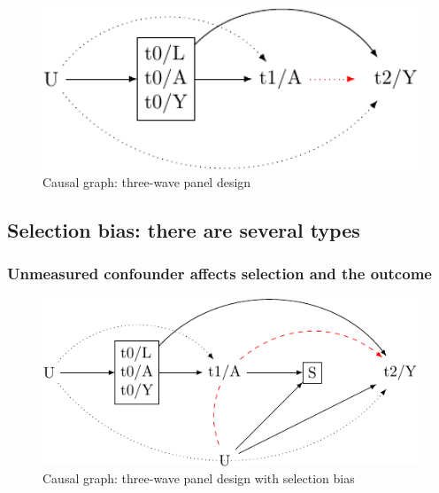 \documentclass[
  singlecolumn]{report}
\begin{document}
\begin{figure}

{\centering \includegraphics[width=1\textwidth,height=\textheight]{causal-dags_files/figure-pdf/fig-dag-6-1.pdf}

}

\caption{\label{fig-dag-6}Causal graph: three-wave panel design}

\end{figure}

\hypertarget{selection-bias-there-are-several-types}{%
\subsection{Selection bias: there are several
types}\label{selection-bias-there-are-several-types}}

\hypertarget{unmeasured-confounder-affects-selection-and-the-outcome}{%
\subsubsection{Unmeasured confounder affects selection and the
outcome}\label{unmeasured-confounder-affects-selection-and-the-outcome}}

\begin{figure}

{\centering \includegraphics[width=1\textwidth,height=\textheight]{causal-dags_files/figure-pdf/fig-dag-8-1.pdf}

}

\caption{\label{fig-dag-8}Causal graph: three-wave panel design with
selection bias}

\end{figure}
\end{document}
